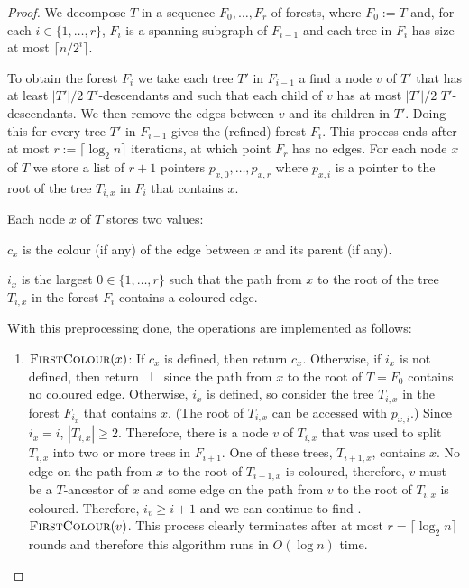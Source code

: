 \documentclass[kpfonts]{patmorin}
\let\ge\geqslant
\begin{document}
\begin{proof}
    We decompose $T$ in a sequence $F_0,\ldots,F_r$ of forests, where $F_0:=T$ and, for each $i\in\{1,\ldots,r\}$, $F_i$ is a spanning subgraph of $F_{i-1}$ and each tree in $F_i$ has size at most $\lceil n/2^i\rceil$.

    To obtain the forest $F_i$ we take each tree $T'$ in $F_{i-1}$
    a find a node $v$ of $T'$ that has at least $|T'|/2$ $T'$-descendants and such that each child of $v$ has at most $|T'|/2$ $T'$-descendants.  We then remove the edges between $v$ and its children in $T'$.  Doing this for every tree $T'$ in $F_{i-1}$ gives the (refined) forest $F_i$.  This process ends after at most $r:=\lceil\log_2 n\rceil$ iterations, at which point $F_r$ has no edges.  For each node $x$ of $T$ we store a list of $r+1$ pointers $p_{x,0},\ldots,p_{x,r}$ where $p_{x,i}$ is a pointer to the root of the tree $T_{i,x}$ in $F_i$ that contains $x$.

    Each node $x$ of $T$ stores two values:
    \begin{compactenum}
      \item $c_x$ is the colour (if any) of the edge between $x$ and its parent (if any).
      \item $i_x$ is the largest $0\in\{1,\ldots,r\}$ such that the path from $x$ to the root of the tree $T_{i,x}$ in the forest $F_i$ contains a coloured edge.
    \end{compactenum}

    With this preprocessing done, the operations are implemented as follows:
    \begin{enumerate}
    \item $\textsc{FirstColour}(x)$:  If $c_x$ is defined, then return $c_x$.   Otherwise, if $i_x$ is not defined, then return $\perp$ since the path from $x$ to the root of $T=F_0$ contains no coloured edge.  Otherwise, $i_x$ is defined, so consider the tree $T_{i,x}$ in the forest $F_{i_x}$ that contains $x$.  (The root of $T_{i,x}$ can be accessed with $p_{x,i}$.)  Since $i_x=i$, $|T_{i,x}|\ge 2$.  Therefore, there is a node $v$ of $T_{i,x}$ that was used to split $T_{i,x}$ into two or more trees in $F_{i+1}$.  One of these trees, $T_{i+1,x}$, contains $x$.  No edge on the path from $x$ to the root of $T_{i+1,x}$ is coloured, therefore, $v$ must be a $T$-ancestor of $x$ and some edge on the path from $v$ to the root of $T_{i,x}$ is coloured.  Therefore, $i_v\ge i+1$ and we can continue to find .
    $\textsc{FirstColour}(v)$.  This process clearly terminates after at most $r=\lceil\log_2 n\rceil$ rounds and therefore this algorithm runs in $O(\log n)$ time.


\end{enumerate}
\end{proof}
\end{document}
